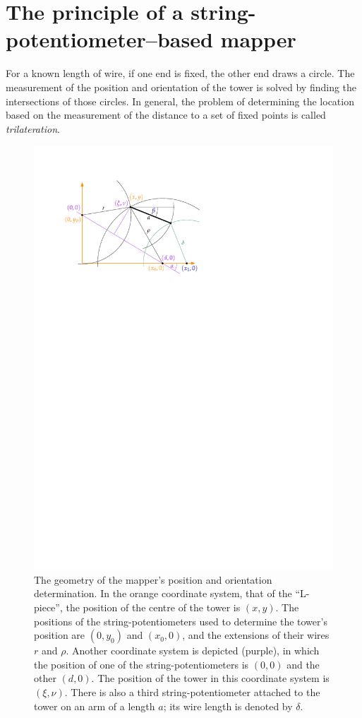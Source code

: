 \section{The principle of a string-potentiometer--based mapper}
For a known length of wire, if one end is fixed, the other end draws a circle.
The measurement of the position and orientation of the tower is solved by finding the intersections of those circles.
In general, the problem of determining the location based on the measurement of the distance to a set of fixed points is called \emph{trilateration}.

\begin{figure}
  \centering
  \includegraphics[width=0.7\linewidth]{gfx/mapping/geometry.pdf}
  \caption{The geometry of the mapper's position and orientation determination.
  In the orange coordinate system, that of the ``L-piece'', the position of the centre of the tower is $(x,y)$.
  The positions of the string-potentiometers used to determine the tower's position are $(0, y_0)$ and $(x_0, 0)$, and the extensions of their wires $r$ and $\rho$.
  Another coordinate system is depicted (purple), in which the position of one of the string-potentiometers is $(0,0)$ and the other $(d, 0)$.
  The position of the tower in this coordinate system is $(\xi, \nu)$.
  There is also a third string-potentiometer attached to the tower on an arm of a length $a$; its wire length is denoted by $\delta$.}\label{fig:mapping_geometry}
\end{figure}


